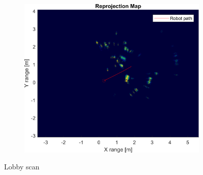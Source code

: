 \begin{figure}[htbp]
\begin{subfigure}[t]{0.475\linewidth}
    \end{subfigure}%
    \hfill%
    \begin{subfigure}[t]{0.475\linewidth}   
        \centering 
        \includegraphics[width=\linewidth,max height=.475\textheight]{gfx/results/lobby_reprojection.png}
    \end{subfigure}%
    \caption{Lobby scan}
\end{figure}

